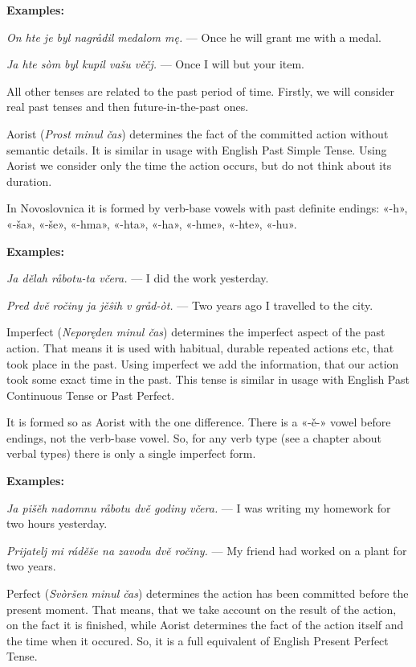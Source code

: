 \textbf{Examples:}

\textit{On hte je byl nagrådil medalom mę.} — Once he will grant me with a medal.

\textit{Ja hte sòm byl kupil vašu věčj.} — Once I will but your item.

All other tenses are related to the past period of time. Firstly, we will consider real past tenses and then future-in-the-past ones.

Aorist (\textit{Prost minul čas}) determines the fact of the committed action without semantic details. It is similar in usage with English Past Simple Tense. Using Aorist we consider only the time the action occurs, but do not think about its duration.

In Novoslovnica it is formed by verb-base vowels with past definite endings: «-h», «-ša», «-še», «-hma», «-hta», «-ha», «-hme», «-hte», «-hu».

\textbf{Examples:}

\textit{Ja dělah råbotu-ta včera.} — I did the work yesterday.

\textit{Pred dvě ročiny ja jěŝih v gråd-òt.} — Two years ago I travelled to the city.

Imperfect (\textit{Neporęden minul čas}) determines the imperfect aspect of the past action. That means it is used with habitual, durable repeated actions etc, that took place in the past. Using imperfect we add the information, that our action took some exact time in the past. This tense is similar in usage with English Past Continuous Tense or Past Perfect.

It is formed so as Aorist with the one difference. There is a «-ě-» vowel before endings, not the verb-base vowel. So, for any verb type (see a chapter about verbal types) there is only a single imperfect form.

\textbf{Examples:}

\textit{Ja pišěh nadomnu råbotu dvě godiny včera.} — I was writing my homework for two hours yesterday.

\textit{Prijatelj mi ráděše na zavodu dvě ročiny.} — My friend had worked on a plant for two years.

Perfect (\textit{Svòršen minul čas}) determines the action has been committed before the present moment. That means, that we take account on the result of the action, on the fact it is finished, while Aorist determines the fact of the action itself and the time when it occured. So, it is a full equivalent of English Present Perfect Tense.

